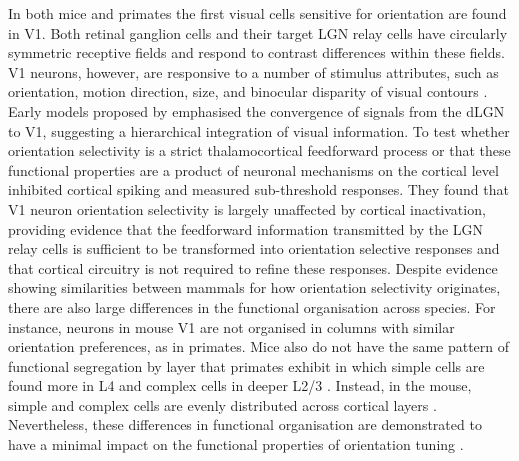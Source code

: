 \documentclass[12pt]{article}
\begin{document}
In both mice and primates the first visual cells sensitive for orientation are found in V1. Both retinal ganglion cells and their target LGN relay cells have circularly symmetric receptive fields and respond to contrast differences within these fields. V1 neurons, however, are responsive to a number of stimulus attributes, such as orientation, motion direction, size, and binocular disparity of visual contours \autocite{hubelReceptiveFieldsBinocular1962}. Early models proposed by \textcite{hubelReceptiveFieldsBinocular1962} emphasised the convergence of signals from the dLGN to V1, suggesting a hierarchical integration of visual information. To test whether orientation selectivity is a strict thalamocortical feedforward process or that these functional properties are a product of neuronal mechanisms on the cortical level \textcite{fersterOrientationSelectivityThalamic1996} inhibited cortical spiking and measured sub-threshold responses. They found that V1 neuron orientation selectivity is largely unaffected by cortical inactivation, providing evidence that the feedforward information transmitted by the LGN relay cells is sufficient to be transformed into orientation selective responses and that cortical circuitry is not required to refine these responses. Despite evidence showing similarities between mammals for how orientation selectivity originates, there are also large differences in the functional organisation across species. For instance, neurons in mouse V1 are not organised in columns with similar orientation preferences, as in primates. Mice also do not have the same pattern of functional segregation by layer that primates exhibit in which simple cells are found more in L4 and complex cells in deeper L2/3 \autocite{martinezReceptiveFieldStructure2005}. Instead, in the mouse, simple and complex cells are evenly distributed across cortical layers \autocite{niellHighlySelectiveReceptive2008}. Nevertheless, these differences in functional organisation are demonstrated to have a minimal impact on the functional properties of orientation tuning \autocite{hooserOrientationSelectivityOrientation2005}. 
\end{document}

